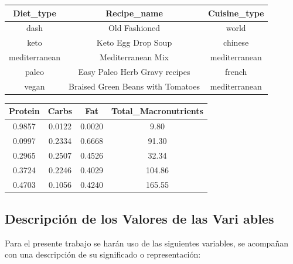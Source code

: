 \documentclass[12pt,a4paper]{article}
\begin{document}
        \begin{center}

            \begin{tabular}{| c | c | c |}
                \toprule
                \textbf{Diet\_type} & \textbf{Recipe\_name} & \textbf{Cuisine\_type} \\
                \midrule
                dash          & Old Fashioned                     & world \\
                keto          & Keto Egg Drop Soup                & chinese \\
                mediterranean & Mediterranean Mix                 & mediterranean \\
                paleo         & Easy Paleo Herb Gravy recipes     & french \\
                vegan         & Braised Green Beans with Tomatoes & mediterranean \\
                \bottomrule
            \end{tabular}

        \end{center}

        \begin{center}

            \begin{tabular}{| c | c | c | c |}
                \toprule
                \textbf{Protein} & \textbf{Carbs} & \textbf{Fat} & \textbf{Total\_Macronutrients} \\
                \midrule
                0.9857 & 0.0122 & 0.0020 &   9.80 \\
                0.0997 & 0.2334 & 0.6668 &  91.30 \\
                0.2965 & 0.2507 & 0.4526 &  32.34 \\
                0.3724 & 0.2246 & 0.4029 & 104.86 \\
                0.4703 & 0.1056 & 0.4240 & 165.55 \\
                \bottomrule
            \end{tabular}

        \end{center}

    \subsection{Descripción de los Valores de las Vari
    ables}

        Para el presente trabajo se harán uso de las siguientes variables, se 
        acompañan con una descripción de su significado o representación:
\end{document}
